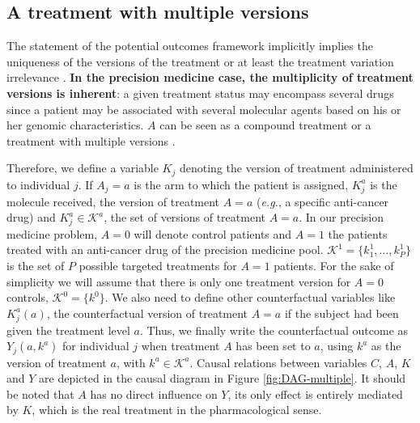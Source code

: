 \documentclass[a4paper,12pt,twoside,onecolumn,openright,final,oldfontcommands]{memoir}
\begin{document}
\subsection{A treatment with multiple
versions}\label{a-treatment-with-multiple-versions}

The statement of the potential outcomes framework implicitly implies the
uniqueness of the versions of the treatment
\citep{rubin1980randomization} or at least the treatment variation
irrelevance \citep{vanderweele2009concerning}. \textbf{In the precision
medicine case, the multiplicity of treatment versions is inherent}: a
given treatment status may encompass several drugs since a patient may
be associated with several molecular agents based on his or her genomic
characteristics. \(A\) can be seen as a compound treatment
\citep{hernan2011compound} or a treatment with multiple versions
\citep{vanderweele2013causal}.

Therefore, we define a variable \(K_j\) denoting the version of
treatment administered to individual \(j\). If \(A_j=a\) is the arm to
which the patient is assigned, \(K^a_j\) is the molecule received, the
version of treatment \(A=a\) (\emph{e.g.}, a specific anti-cancer drug)
and \(K^a_j \in \mathcal{K}^a\), the set of versions of treatment
\(A=a\). In our precision medicine problem, \(A=0\) will denote control
patients and \(A=1\) the patients treated with an anti-cancer drug of
the precision medicine pool. \(\mathcal{K}^1=\{k^1_1, ..., k^1_P\}\) is
the set of \(P\) possible targeted treatments for \(A=1\) patients. For
the sake of simplicity we will assume that there is only one treatment
version for \(A=0\) controls, \(\mathcal{K}^0=\{k^0\}\). We also need to
define other counterfactual variables like \(K^a_j(a)\), the
counterfactual version of treatment \(A=a\) if the subject had been
given the treatment level \(a\). Thus, we finally write the
counterfactual outcome as \(Y_j(a,k^a)\) for individual \(j\) when
treatment \(A\) has been set to \(a\), using \(k^a\) as the version of
treatment \(a\), with \(k^a \in \mathcal{K}^a\). Causal relations
between variables \(C\), \(A\), \(K\) and \(Y\) are depicted in the
causal diagram in Figure \ref{fig:DAG-multiple}. It should be noted that
\(A\) has no direct influence on \(Y\), its only effect is entirely
mediated by \(K\), which is the real treatment in the pharmacological
sense.
\end{document}
